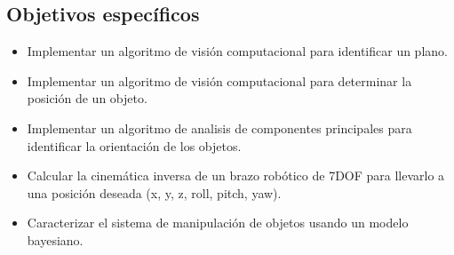 		\subsection*{Objetivos específicos}
			\begin{itemize}
				\item Implementar un algoritmo de visión computacional para identificar un plano.

				\item Implementar un algoritmo de visión computacional para determinar la posición de un objeto.

				\item Implementar un algoritmo de analisis de componentes principales para identificar la orientación de los objetos.

				\item Calcular la cinemática inversa de un brazo robótico de 7DOF para llevarlo a una posición deseada (x, y, z, roll, pitch, yaw).

				\item Caracterizar el sistema de manipulación de objetos usando un modelo bayesiano.

			\end{itemize}